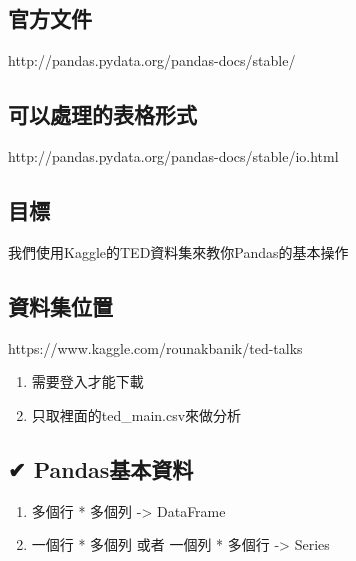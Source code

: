 \documentclass[11pt]{ctexart}
\providecommand{\tightlist}{%
      \setlength{\itemsep}{0pt}\setlength{\parskip}{0pt}}
\begin{document}
\hypertarget{ux5b98ux65b9ux6587ux4ef6}{%
\subsection{官方文件}\label{ux5b98ux65b9ux6587ux4ef6}}

http://pandas.pydata.org/pandas-docs/stable/

\hypertarget{ux53efux4ee5ux8655ux7406ux7684ux8868ux683cux5f62ux5f0f}{%
\subsection{可以處理的表格形式}\label{ux53efux4ee5ux8655ux7406ux7684ux8868ux683cux5f62ux5f0f}}

http://pandas.pydata.org/pandas-docs/stable/io.html

\hypertarget{ux76eeux6a19}{%
\subsection{目標}\label{ux76eeux6a19}}

我們使用Kaggle的TED資料集來教你Pandas的基本操作

\hypertarget{ux8cc7ux6599ux96c6ux4f4dux7f6e}{%
\subsection{資料集位置}\label{ux8cc7ux6599ux96c6ux4f4dux7f6e}}

https://www.kaggle.com/rounakbanik/ted-talks

\begin{enumerate}
\def\labelenumi{\arabic{enumi}.}
\tightlist
\item
  需要登入才能下載
\item
  只取裡面的ted\_main.csv來做分析
\end{enumerate}

\hypertarget{pandasux57faux672cux8cc7ux6599}{%
\subsection{✔ Pandas基本資料}\label{pandasux57faux672cux8cc7ux6599}}

\begin{enumerate}
\def\labelenumi{\arabic{enumi}.}
\tightlist
\item
  多個行 * 多個列 -\textgreater{} DataFrame
\item
  一個行 * 多個列 或者 一個列 * 多個行 -\textgreater{} Series
\end{enumerate}
\end{document}
